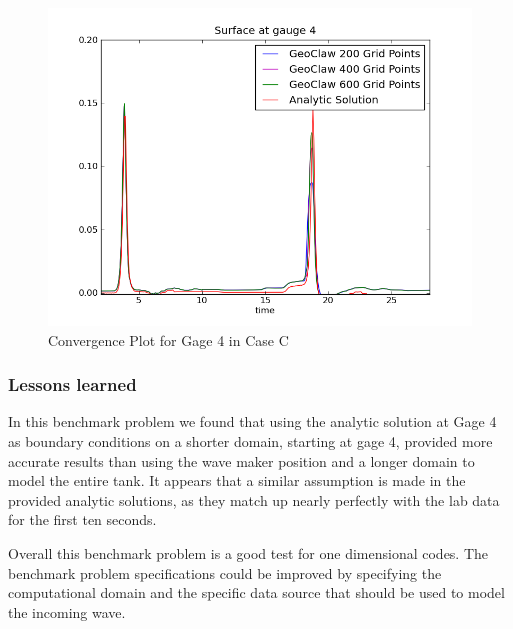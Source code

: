 \begin{figure}[ht]
\hfil\includegraphics[width=5in]{bp2/linearCompare}\hfil
\caption{\label{fig:linearConverge} Convergence Plot for Gage 4 in Case C }
\end{figure}


\subsubsection{Lessons learned}
In this benchmark problem we found that using the analytic solution at Gage 4 as boundary conditions on a shorter domain, starting at gage 4, provided more accurate results than using the wave maker position and a longer domain to model the entire tank.  It appears that a similar assumption is made in the provided analytic solutions, as they match up nearly perfectly with the lab data for the first ten seconds.  

Overall this benchmark problem is a good test for one dimensional codes.  The benchmark problem specifications could be improved by specifying the computational domain and the specific data source that should be used to model the incoming wave. 

